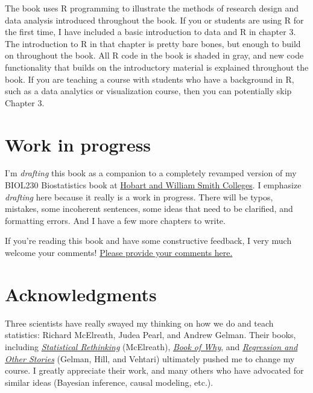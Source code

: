 \documentclass[
]{book}
\begin{document}
The book uses R programming to illustrate the methods of research design and data analysis introduced throughout the book. If you or students are using R for the first time, I have included a basic introduction to data and R in chapter 3. The introduction to R in that chapter is pretty bare bones, but enough to build on throughout the book. All R code in the book is shaded in gray, and new code functionality that builds on the introductory material is explained throughout the book. If you are teaching a course with students who have a background in R, such as a data analytics or visualization course, then you can potentially skip Chapter 3.

\section*{Work in progress}\label{work-in-progress}

I'm \emph{drafting} this book as a companion to a completely revamped version of my BIOL230 Biostatistics book at \href{https://www.hws.edu/}{Hobart and William Smith Colleges}. I emphasize \emph{drafting} here because it really is a work in progress. There will be typos, mistakes, some incoherent sentences, some ideas that need to be clarified, and formatting errors. And I have a few more chapters to write.

If you're reading this book and have some constructive feedback, I very much welcome your comments! \href{https://docs.google.com/forms/d/e/1FAIpQLSco86EWOAgHz1HfIJ3-fKW5g0OyTBJ_Zm0anffUgggP4XixAg/viewform?usp=dialog}{Please provide your comments here.}

\section*{Acknowledgments}\label{acknowledgments}

Three scientists have really swayed my thinking on how we do and teach statistics: Richard McElreath, Judea Pearl, and Andrew Gelman. Their books, including \href{https://www.routledge.com/Statistical-Rethinking-A-Bayesian-Course-with-Examples-in-R-and-STAN/McElreath/p/book/9780367139919}{\emph{Statistical Rethinking}} (McElreath), \href{https://www.hachettebookgroup.com/titles/judea-pearl/the-book-of-why/9780465097609/?lens=basic-books}{\emph{Book of Why}}, and \href{https://avehtari.github.io/ROS-Examples/}{\emph{Regression and Other Stories}} (Gelman, Hill, and Vehtari) ultimately pushed me to change my course. I greatly appreciate their work, and many others who have advocated for similar ideas (Bayesian inference, causal modeling, etc.).
\end{document}
